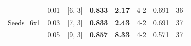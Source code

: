 \begin{table}[!htbp]
{\begin{tabular}{@{}ll | ccc | ccc@{}}
\multirow{3}{*}{Seeds\_6x1} 
 & 0.01 & [6, 3] & \textbf{0.833} & \textbf{2.17} & 4-2 & 0.691 & 36 \\
 & 0.03 & [7, 3] & \textbf{0.833} & \textbf{2.43} & 4-2 & 0.691 & 37 \\
 & 0.05 & [9, 3] & \textbf{0.857} & \textbf{8.33} & 4-2 & 0.571 & 37 \\

\bottomrule
\end{tabular}%
}
\end{table}
